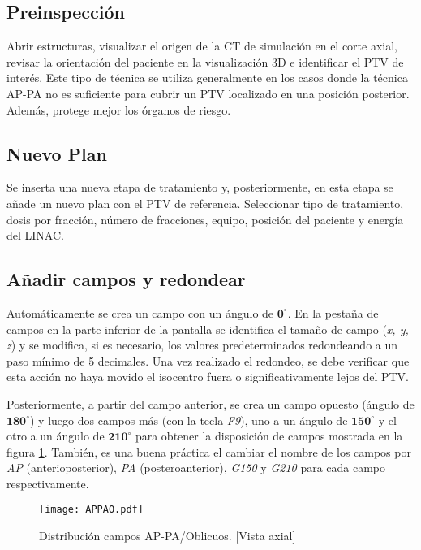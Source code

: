 \documentclass{article}
\begin{document}
\subsection{Preinspección}

Abrir estructuras, visualizar el origen de la CT de simulación en el corte axial, revisar la orientación del paciente en la visualización 3D e identificar el PTV de interés. Este tipo de técnica se utiliza generalmente en los casos donde la técnica AP-PA no es suficiente para cubrir un PTV localizado en una posición posterior. Además, protege mejor los órganos de riesgo.

\subsection{Nuevo Plan}

Se inserta una nueva etapa de tratamiento y, posteriormente, en esta etapa se añade un nuevo plan con el PTV de referencia. Seleccionar tipo de tratamiento, dosis por fracción, número de fracciones, equipo, posición del paciente y energía del LINAC.

\subsection{Añadir campos y redondear}

Automáticamente se crea un campo con un ángulo de $\mathbf{0^{\circ}}$. En la pestaña de campos en la parte inferior de la pantalla se identifica el tamaño de campo (\textit{x, y, z}) y se modifica, si es necesario, los valores predeterminados redondeando a un paso mínimo de 5 decimales. Una vez realizado el redondeo, se debe verificar que esta acción no haya movido el isocentro fuera o significativamente lejos del PTV.

Posteriormente, a partir del campo anterior, se crea un campo opuesto (ángulo de $\mathbf{180^{\circ}}$) y luego dos campos más (con la tecla \textit{F9}), uno a un ángulo de $\mathbf{150^{\circ}}$ y el otro a un ángulo de $\mathbf{210^{\circ}}$ para obtener la disposición de campos mostrada en la figura \ref{APPAO}. También, es una buena práctica el cambiar el nombre de los campos por \textit{AP} (anterioposterior), \textit{PA} (posteroanterior), \textit{G150} y \textit{G210} para cada campo respectivamente.

\begin{figure}[!ht]
    \centering
    \texttt{[image: APPAO.pdf]}
    \caption{Distribución campos AP-PA/Oblicuos. [Vista axial]}
    \label{APPAO}
\end{figure}
\end{document}
